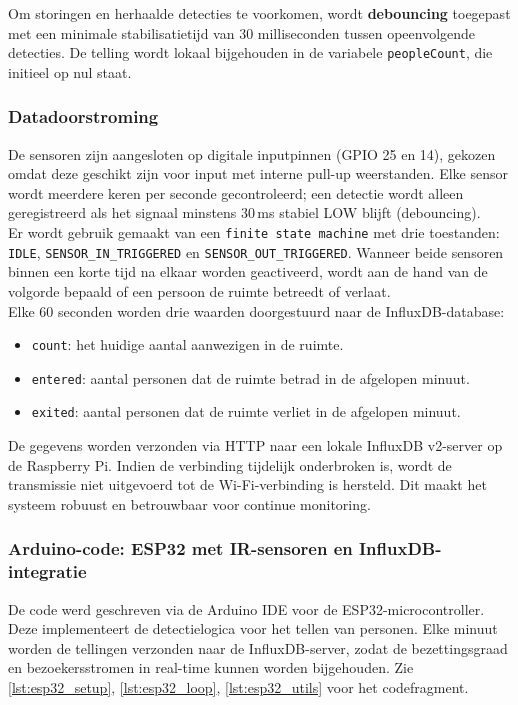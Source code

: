 Om storingen en herhaalde detecties te voorkomen, wordt \textbf{debouncing} toegepast met een minimale stabilisatietijd van 30 milliseconden tussen opeenvolgende detecties. De telling wordt lokaal bijgehouden in de variabele \texttt{peopleCount}, die initieel op nul staat.


\subsubsection{Datadoorstroming}
De sensoren zijn aangesloten op digitale inputpinnen (GPIO 25 en 14), gekozen omdat deze geschikt zijn voor input met interne pull-up weerstanden. Elke sensor wordt meerdere keren per seconde gecontroleerd; een detectie wordt alleen geregistreerd als het signaal minstens 30 ms stabiel LOW blijft (debouncing). \\

Er wordt gebruik gemaakt van een \texttt{finite state machine} met drie toestanden: \texttt{IDLE}, \texttt{SENSOR\_IN\_TRIGGERED} en \texttt{SENSOR\_OUT\_TRIGGERED}. Wanneer beide sensoren binnen een korte tijd na elkaar worden geactiveerd, wordt aan de hand van de volgorde bepaald of een persoon de ruimte betreedt of verlaat.  \\

Elke 60 seconden worden drie waarden doorgestuurd naar de InfluxDB-database:
\begin{itemize}
    \item \texttt{count}: het huidige aantal aanwezigen in de ruimte.
    \item \texttt{entered}: aantal personen dat de ruimte betrad in de afgelopen minuut.
    \item \texttt{exited}: aantal personen dat de ruimte verliet in de afgelopen minuut.
\end{itemize}

De gegevens worden verzonden via HTTP naar een lokale InfluxDB v2-server op de Raspberry Pi. Indien de verbinding tijdelijk onderbroken is, wordt de transmissie niet uitgevoerd tot de Wi-Fi-verbinding is hersteld. Dit maakt het systeem robuust en betrouwbaar voor continue monitoring.
 
\subsubsection{Arduino-code: ESP32 met IR-sensoren en InfluxDB-integratie} 
De code werd geschreven via de Arduino IDE voor de ESP32-microcontroller. Deze implementeert de detectielogica voor het tellen van personen. Elke minuut worden de tellingen verzonden naar de InfluxDB-server, zodat de bezettingsgraad en bezoekersstromen in real-time kunnen worden bijgehouden. Zie \ref{lst:esp32_setup},  \ref{lst:esp32_loop}, \ref{lst:esp32_utils} voor het codefragment.

